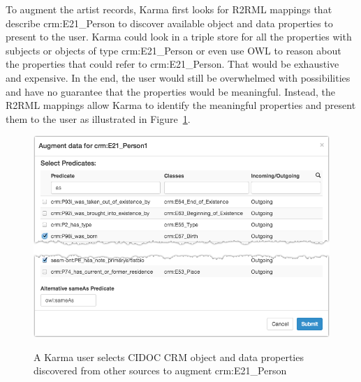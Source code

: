 To augment the artist records, Karma first looks for R2RML mappings that describe crm:E21\_Person to discover available object and data properties to present to the user.
Karma could look in a triple store for all the properties with subjects or objects of type crm:E21\_Person or even use OWL to reason about the properties that could refer to crm:E21\_Person.
That would be exhaustive and expensive.
In the end, the user would still be overwhelmed with possibilities and have no guarantee that the properties would be meaningful.
Instead, the R2RML mappings allow Karma to identify the meaningful properties and present them to the user as illustrated in Figure~\ref{fig:search-screenshot}.
\begin{figure}
\begin{center}
\includegraphics[width=4.9in]{images/5-search.png}
\vspace{-3mm}
\caption{A Karma user selects CIDOC CRM object and data properties discovered from other sources to augment crm:E21\_Person}
\vspace{-2mm}
\label{fig:search-screenshot}
\end{center}
\vspace{-1.5em}
\end{figure}